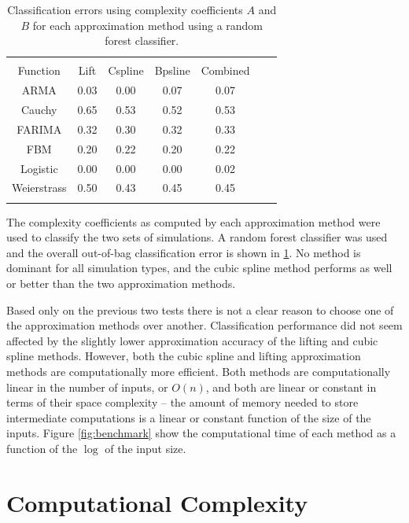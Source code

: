 \begin{table}[!htbp] \centering 
\begin{tabular}{@{\extracolsep{1pt}} ccccccc} 
\\[-1.8ex]\hline 
\hline \\[-1.8ex] 
Function    &  Lift & Cspline & Bpsline  & Combined 
                                       \\ \hline
ARMA        & 0.03 &   0.00 &   0.07 &   0.07  \\ 
Cauchy      & 0.65 &   0.53 &   0.52  &    0.53  \\ 
FARIMA      & 0.32 &   0.30 &   0.32  &    0.33 \\ 
FBM         & 0.20  &   0.22  & 0.20 &  0.22  \\ 
Logistic    & 0.00 &   0.00 &   0.00  &    0.02  \\ 
Weierstrass & 0.50 &   0.43 &   0.45  &    0.45  \\
\hline \\[-1.8ex] 
          \end{tabular} 
  \caption{Classification errors using complexity coefficients  
  $A$ and $B$ for each approximation method using a random 
  forest classifier.}
  \label{tab:error-all}
\end{table}

The complexity coefficients as computed by each approximation method were used to classify the two
sets of simulations. A random forest classifier was used and the overall out-of-bag classification error is shown in \ref{tab:error-all}. No method is dominant for all simulation types, and the cubic spline method performs as well or better than the two approximation methods. 

Based only on the previous two tests there is 
not a clear reason to choose 
one of the approximation methods over another. Classification performance did not seem affected by the slightly lower approximation accuracy of the lifting and cubic spline methods. However, both the cubic spline and lifting approximation methods are computationally more efficient. Both methods are computationally linear in the number of inputs, or $O(n)$, and both are linear or constant in terms of their space complexity -- the amount of memory needed to store intermediate computations is a linear or constant function of the size of the inputs. 
Figure \ref{fig:benchmark} show the computational time of 
each method as a function of the $\log$ of the input size.

\section{Computational Complexity}

